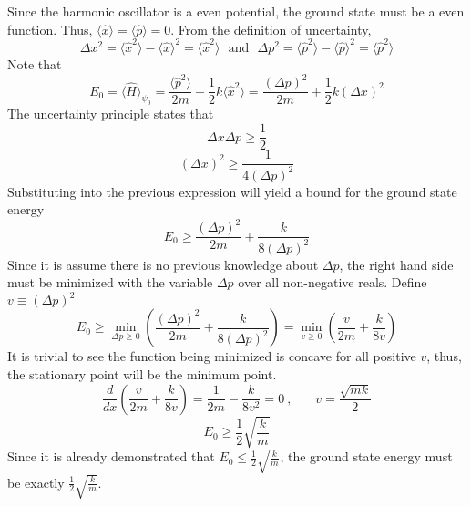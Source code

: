 \begin{sol}
Since the harmonic oscillator is a even potential, the ground state must be a even function. Thus, $\langle \hat x\rangle=\langle\hat p\rangle=0$. From the definition of uncertainty, 
\begin{equation}
	\Delta x^2=\langle \hat x^2\rangle-\langle \hat x\rangle^2=\langle \hat x^2\rangle\,\,\text{      and      }\,\,\Delta p^2=\langle \hat p^2\rangle-\langle \hat p\rangle^2=\langle \hat p^2\rangle
\end{equation}
Note that \begin{equation}
	E_0=\langle \hat{H}\rangle_{\psi_0}=\frac{\langle \hat p^2\rangle}{2m}+\frac{1}{2}k\langle \hat x^2\rangle=\frac{(\Delta p)^2}{2m}+\frac{1}{2}k(\Delta x)^2
\end{equation}
The uncertainty principle states that
\begin{equation}
	\Delta x\Delta p\geq\frac{1}{2}
\end{equation}
\begin{equation}
	(\Delta x)^2\geq\frac{1}{4(\Delta p)^2}
\end{equation}
Substituting into the previous expression will yield a bound for the ground state energy
\begin{equation}
	E_0\geq\frac{(\Delta p)^2}{2m}+\frac{k}{8(\Delta p)^2}
\end{equation}
Since it is assume there is no previous knowledge about $\Delta p$, the right hand side must be minimized with the variable $\Delta p$ over all non-negative reals. Define $v\equiv(\Delta p)^2$
\begin{equation}
	E_0\geq\min_{\Delta p\geq 0}\left(\frac{(\Delta p)^2}{2m}+\frac{k}{8(\Delta p)^2}\right)=\min_{v\geq 0}\left(\frac{v}{2m}+\frac{k}{8v}\right)
\end{equation}
It is trivial to see the function being minimized is concave for all positive $v$, thus, the stationary point will be the minimum point.
\begin{equation}
	\frac{d}{dx}\left(\frac{v}{2m}+\frac{k}{8v}\right)=\frac{1}{2m}-\frac{k}{8v^2}=0\:,\:\:\:\:\:\:\:\:v=\frac{\sqrt{mk}}{2}
\end{equation}
\begin{equation}
	E_0\geq\frac{1}{2}\sqrt{\frac{k}{m}}
\end{equation}
Since it is already demonstrated that $\displaystyle{E_0\leq \frac{1}{2}\sqrt{\frac{k}{m}}}$, the ground state energy must be exactly $\displaystyle{\frac{1}{2}\sqrt{\frac{k}{m}}}$.
\end{sol}